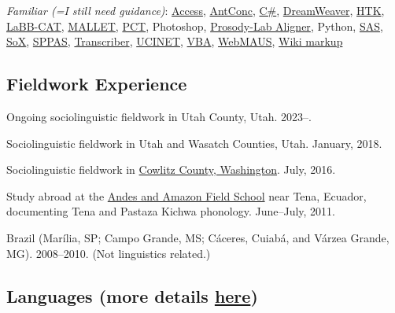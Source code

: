 \documentclass[
]{article}
\begin{document}
\emph{Familiar (=I still need guidance)}:
\href{https://products.office.com/en-US/access}{Access},
\href{http://www.laurenceanthony.net/software.html}{AntConc},
\href{https://en.wikipedia.org/wiki/C_Sharp_(programming_language)}{C\#},
\href{http://www.adobe.com/products/dreamweaver.html?sdid=KKQTJ\&mv=search\&s_kwcid=AL!3085!3!110812694443!e!!g!!dreamweaver\&ef_id=V7iPrwAAAUYcBTnE:20160826185837:s}{DreamWeaver},
\href{http://htk.eng.cam.ac.uk}{HTK},
\href{http://labbcat.sourceforge.net}{LaBB-CAT},
\href{http://mallet.cs.umass.edu/index.php}{MALLET},
\href{http://phonologicalcorpustools.github.io/CorpusTools/}{PCT},
Photoshop, \href{http://prosodylab.org/tools/aligner/}{Prosody-Lab
Aligner}, Python, \href{http://www.sas.com/}{SAS},
\href{http://sox.sourceforge.net}{SoX},
\href{http://www.sppas.org}{SPPAS},
\href{http://trans.sourceforge.net/en/presentation.php}{Transcriber},
\href{https://sites.google.com/site/ucinetsoftware/home}{UCINET},
\href{https://en.wikipedia.org/wiki/Visual_Basic_for_Applications}{VBA},
\href{http://clarin.phonetik.uni-muenchen.de/BASWebServices/\#/services/WebMAUSBasic}{WebMAUS},
\href{https://en.wikipedia.org/wiki/Help:Wiki_markup}{Wiki markup}

\hypertarget{fieldwork-experience}{%
\subsection{Fieldwork Experience}\label{fieldwork-experience}}

Ongoing sociolinguistic fieldwork in Utah County, Utah. 2023--.

Sociolinguistic fieldwork in Utah and Wasatch Counties, Utah. January,
2018.

Sociolinguistic fieldwork in
\href{https://en.wikipedia.org/wiki/Cowlitz_County,_Washington}{Cowlitz
County, Washington}. July, 2016.

Study abroad at the
\href{http://www.andes-fieldschool.org/Andes_and_Amazon_Field_School/Home.html}{Andes
and Amazon Field School} near Tena, Ecuador, documenting Tena and
Pastaza Kichwa phonology. June--July, 2011.

Brazil (Marília, SP; Campo Grande, MS; Cáceres, Cuiabá, and Várzea
Grande, MG). 2008--2010. (Not linguistics related.)

\hypertarget{languages-more-details-here}{%
\subsection{\texorpdfstring{Languages (more details
\href{/blog/stories-behind-the-languages-ive-studied}{here})}{Languages (more details here)}}\label{languages-more-details-here}}
\end{document}
